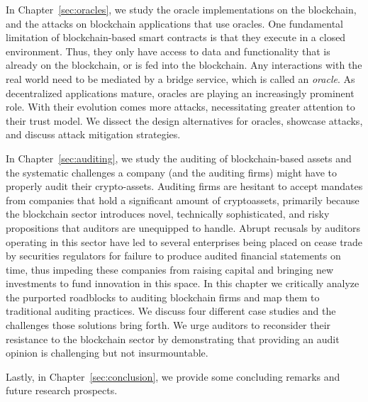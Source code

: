 In Chapter~\ref{sec:oracles}, we study the oracle implementations on the blockchain, and the attacks on blockchain applications that use oracles. One fundamental limitation of blockchain-based smart contracts is that they execute in a closed environment. Thus, they only have access to data and functionality that is already on the blockchain, or is fed into the blockchain. Any interactions with the real world need to be mediated by a bridge service, which is called an \textit{oracle}. As decentralized applications mature, oracles are playing an increasingly prominent role. With their evolution comes more attacks, necessitating greater attention to their trust model. We dissect the design alternatives for oracles, showcase attacks, and discuss attack mitigation strategies.


In Chapter~\ref{sec:auditing}, we study the auditing of blockchain-based assets and the systematic challenges a company (and the auditing firms) might have to properly audit their crypto-assets. Auditing firms are hesitant to accept mandates from companies that hold a significant amount of cryptoassets, primarily because the blockchain sector introduces novel, technically sophisticated, and risky propositions that auditors are unequipped to handle. Abrupt recusals by auditors operating in this sector have led to several enterprises being placed on cease trade by securities regulators for failure to produce audited financial statements on time, thus impeding these companies from raising capital and bringing new investments to fund innovation in this space. In this chapter we critically analyze the purported roadblocks to auditing blockchain firms and map them to traditional auditing practices. We discuss four different case studies and the challenges those solutions bring forth. We urge auditors to reconsider their resistance to the blockchain sector by demonstrating that providing an audit opinion is challenging but not insurmountable.


Lastly, in Chapter~\ref{sec:conclusion}, we provide some concluding remarks and future research prospects.


